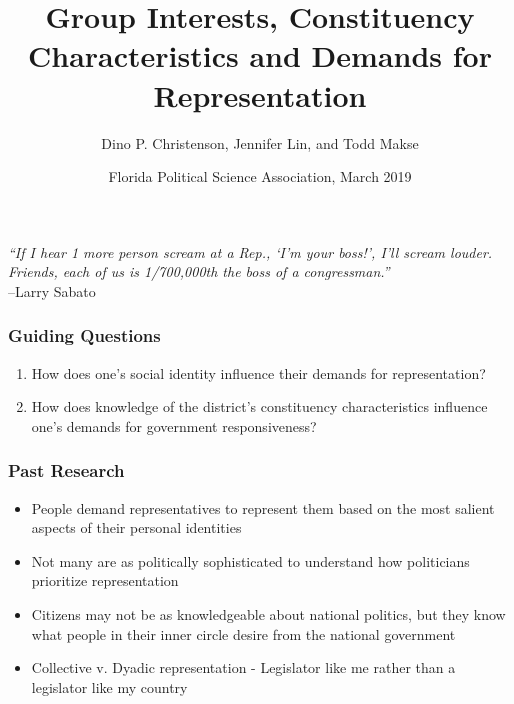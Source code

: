 \documentclass[14pt]{beamer}
\newcommand\e{\emph}
\begin{document}
\author[D. Christenson, J. Lin, and T. Makse] %
{Dino P. Christenson, Jennifer Lin, and Todd Makse}
\title[Demands for Representation]{Group Interests, Constituency Characteristics and Demands for Representation}
	\date[FPSA 2019]{Florida Political Science Association, March 2019}
	\begin{frame}[plain]
	\maketitle
\end{frame}

\begin{frame}
\begin{center}
	\e{“If I hear 1 more person scream at a Rep., ‘I’m your boss!’, I’ll scream louder.
	Friends, each of us is 1/700,000th the boss of a congressman.”
	} \\
		--Larry Sabato 
\end{center}
\end{frame}

\begin{frame}
\frametitle{Guiding Questions}
\begin{enumerate}
	\item How does one's social identity influence their demands for representation?
	\item How does knowledge of the district's constituency characteristics influence one's demands for government responsiveness? 
\end{enumerate}
\end{frame}

\begin{frame}
\frametitle{Past Research}
\begin{itemize}
	\item People demand representatives to represent them based on the most salient aspects of their personal identities
	\item Not many are as politically sophisticated to understand how politicians prioritize representation
	\item Citizens may not be as knowledgeable about national politics, but they know what people in their inner circle desire from the national government
	\item Collective v. Dyadic representation - Legislator like me rather than a legislator like my country
\end{itemize}
\end{frame}
\end{document}
